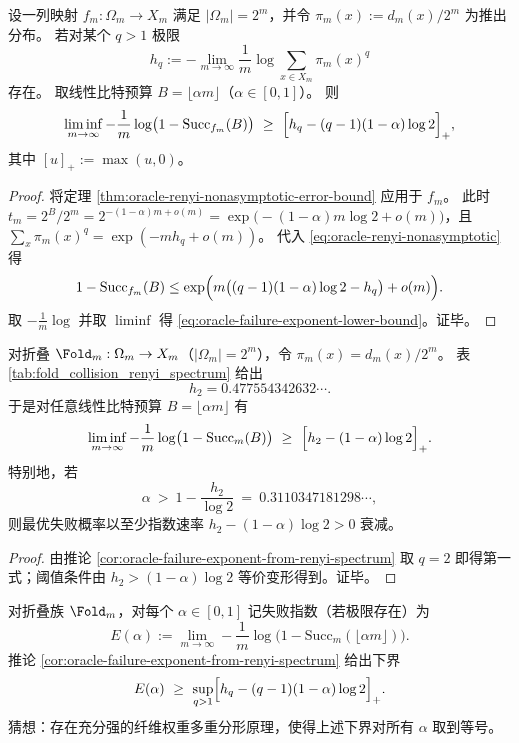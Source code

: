 \begin{corollary}[矩谱给出的预言机失败指数下界]\label{cor:oracle-failure-exponent-from-renyi-spectrum}
设一列映射 \(f_m:\Omega_m\to X_m\) 满足 \(|\Omega_m|=2^m\)，并令 \(\pi_m(x):=d_m(x)/2^m\) 为推出分布。
若对某个 \(q>1\) 极限
\[
h_q:=-\lim_{m\to\infty}\frac{1}{m}\log\sum_{x\in X_m}\pi_m(x)^q
\]
存在。
取线性比特预算 \(B=\lfloor \alpha m\rfloor\)（\(\alpha\in[0,1]\)）。
则
\begin{equation}\label{eq:oracle-failure-exponent-lower-bound}
\liminf_{m\to\infty}-\frac{1}{m}\log\bigl(1-\mathrm{Succ}_{f_m}(B)\bigr)
\ \ge\
\Bigl[h_q-(q-1)(1-\alpha)\log 2\Bigr]_+,
\end{equation}
其中 \([u]_+:=\max(u,0)\)。
\end{corollary}
\begin{proof}
将定理 \ref{thm:oracle-renyi-nonasymptotic-error-bound} 应用于 \(f_m\)。
此时 \(t_m=2^{B}/2^{m}=2^{-(1-\alpha)m+o(m)}=\exp\bigl(-(1-\alpha)m\log 2+o(m)\bigr)\)，且
\(\sum_x\pi_m(x)^q=\exp(-mh_q+o(m))\)。
代入 \eqref{eq:oracle-renyi-nonasymptotic} 得
\[
1-\mathrm{Succ}_{f_m}(B)
\le
\exp\Bigl(m\bigl((q-1)(1-\alpha)\log 2-h_q\bigr)+o(m)\Bigr).
\]
取 \(-\frac1m\log\) 并取 \(\liminf\) 得 \eqref{eq:oracle-failure-exponent-lower-bound}。证毕。
\end{proof}

\begin{corollary}[Fold\(_m\) 的二阶矩证书给出显式成功指数阈值]\label{cor:fold-oracle-success-exponent-from-h2}
对折叠 \(\Fold_m:\Omega_m\to X_m\)（\(|\Omega_m|=2^m\)），令 \(\pi_m(x)=d_m(x)/2^m\)。
表 \ref{tab:fold_collision_renyi_spectrum} 给出
\[
h_2=0.477554342632\cdots .
\]
于是对任意线性比特预算 \(B=\lfloor \alpha m\rfloor\) 有
\[
\liminf_{m\to\infty}-\frac{1}{m}\log\bigl(1-\mathrm{Succ}_{m}(B)\bigr)
\ \ge\
\Bigl[h_2-(1-\alpha)\log 2\Bigr]_+.
\]
特别地，若
\[
\alpha\ >\ 1-\frac{h_2}{\log 2}
\ =\ 0.3110347181298\cdots,
\]
则最优失败概率以至少指数速率 \(h_2-(1-\alpha)\log 2>0\) 衰减。
\end{corollary}
\begin{proof}
由推论 \ref{cor:oracle-failure-exponent-from-renyi-spectrum} 取 \(q=2\) 即得第一式；阈值条件由 \(h_2>(1-\alpha)\log 2\) 等价变形得到。证毕。
\end{proof}

\begin{conjecture}\label{conj:fold-oracle-failure-exponent-duality}
对折叠族 \(\Fold_m\)，对每个 \(\alpha\in[0,1]\) 记失败指数（若极限存在）为
\[
E(\alpha):=\lim_{m\to\infty}-\frac{1}{m}\log\bigl(1-\mathrm{Succ}_m(\lfloor \alpha m\rfloor)\bigr).
\]
推论 \ref{cor:oracle-failure-exponent-from-renyi-spectrum} 给出下界
\[
E(\alpha)\ \ge\ \sup_{q>1}\Bigl[h_q-(q-1)(1-\alpha)\log 2\Bigr]_+.
\]
猜想：存在充分强的纤维权重多重分形原理，使得上述下界对所有 \(\alpha\) 取到等号。
\end{conjecture}
